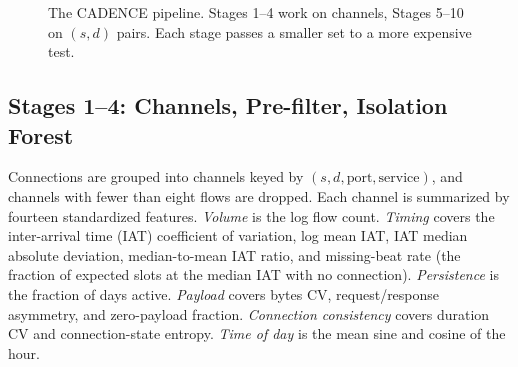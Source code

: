 \documentclass[runningheads]{llncs}
\begin{document}
\begin{figure}[tbp]
\centering
{}
\caption{The CADENCE pipeline. Stages 1--4 work on channels, Stages 5--10 on $(s,d)$ pairs. Each stage passes a smaller set to a more expensive test.}
\label{fig:pipeline}
\end{figure}

\subsection{Stages 1--4: Channels, Pre-filter, Isolation Forest}

Connections are grouped into channels keyed by $(s, d, \text{port}, \text{service})$, and channels with fewer than eight flows are dropped. Each channel is summarized by fourteen standardized features. \emph{Volume} is the log flow count. \emph{Timing} covers the inter-arrival time (IAT) coefficient of variation, log mean IAT, IAT median absolute deviation, median-to-mean IAT ratio, and missing-beat rate (the fraction of expected slots at the median IAT with no connection). \emph{Persistence} is the fraction of days active. \emph{Payload} covers bytes CV, request/response asymmetry, and zero-payload fraction. \emph{Connection consistency} covers duration CV and connection-state entropy. \emph{Time of day} is the mean sine and cosine of the hour.
\end{document}
